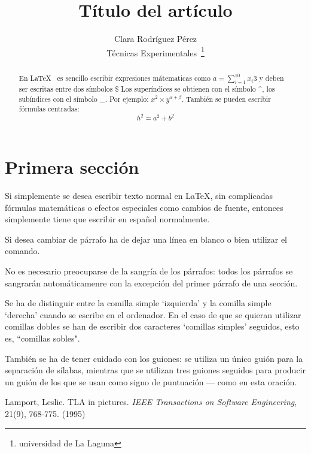 \documentclass[a4paper,12pt]{article}
\begin{document}
\title{Título del artículo}
\author{Clara Rodr\'iguez P\'erez \\
          Técnicas Experimentales~\footnote{universidad de La Laguna}
          }
\date{\Today}
\maketitle
\begin{abstract}
  En \LaTeX{}~\cite{Lam:86} es sencillo escribir expresiones
  mátematicas como $a=\sum_{i=1}^{10} {x_i}{3}$
  y deben ser escritas entre dos símbolos \$
  Los superíndices se obtienen con el símbolo \^{},
  los subíndices con el símbolo \_.
  Por ejemplo: $x^2\times y ^{\alpha + \beta}$.
  También se pueden escribir f\'ormulas centradas:
  \[h^2=a^2  + b^2\]
\end{abstract}

\section{Primera sección}

Si simplemente se desea escribir texto normal en LaTeX, 
sin complicadas f\'ormulas matem\'aticas o efectos especiales
como cambios de fuente, entonces simplemente tiene que escribir
en espa\~nol normalmente.\par
Si desea cambiar de párrafo ha de dejar una línea en blanco o bien
utilizar el comando. \par
No es necesario preocuparse de la sangría de los párrafos:
todos los párrafos se sangrarán automáticamenre con la excepción
del primer párrafo de una sección.

Se ha de distinguir entre la comilla simple `izquierda'
y la comilla simple `derecha' cuando se escribe en el ordenador.
En el caso de que se quieran utilizar comillas dobles se han de
escribir dos caracteres `comillas simples' seguidos, esto es,
``comillas sobles".

También se ha de tener cuidado con los guiones: se utiliza un único
guión para la separación de sílabas, mientras que se utilizan 
tres guiones seguidos para producir un guión de los que se usan 
como signo de puntuación --- como en esta oración.
\begin{thebibliography}{00}
    Lamport, Leslie.
    TLA in pictures.
    \emph{IEEE Transactions on Software Engineering},
    21(9), 768-775.
    (1995)
\end{thebibliography}
\end{document}
